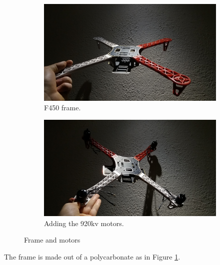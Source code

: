 \begin{figure}[H]
\begin{subfigure}{0.5\textwidth}
\centering
\includegraphics[scale=0.1]{images/drone-build-frame.jpg}
\caption{F450 frame.}
\label{fig:frame}
\end{subfigure}
\begin{subfigure}{0.5\textwidth}
\centering
\includegraphics[scale=0.1]{images/drone-build-motors.jpg}
\caption{Adding the 920kv motors.}
\label{fig:motors}
\end{subfigure}
\caption{Frame and motors}
\label{fig:frame_motors}
\end{figure}

\noindent
The frame is made out of a polycarbonate as in Figure \ref{fig:frame}.\\


